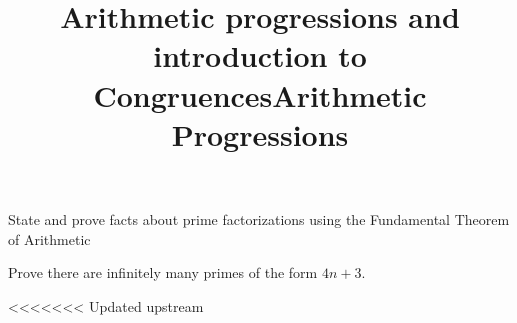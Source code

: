\documentclass{ximera}
\title{Arithmetic progressions and introduction to Congruences}
\title{Arithmetic Progressions}
\begin{document}
\begin{abstract}
\end{abstract}
\maketitle

\begin{obj}
    \item State and prove facts about prime factorizations using the Fundamental Theorem of Arithmetic
    \item Prove there are infinitely many primes of the form $4n+3$.
\end{obj}

<<<<<<< Updated upstream
   


\end{document}
